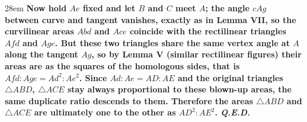 \documentclass[border=4pt]{standalone}
\begin{document}
\begin{varwidth}{28em}
\large\bfseries
Now hold $Ae$ fixed and let $B$ and $C$ meet $A$; the angle $cAg$ between curve      and tangent vanishes, exactly as in Lemma VII, so the curvilinear areas $Abd$ and $Ace$      coincide with the rectilinear triangles $Afd$ and $Age$. But these two triangles      share the same vertex angle at $A$ along the tangent $Ag$, so by Lemma V (similar      rectilinear figures) their areas are as the squares of the homologous sides, that is      $Afd : Age = Ad^2 : Ae^2$. Since $Ad : Ae = AD : AE$ and the original triangles $\triangle      ABD$, $\triangle ACE$ stay always proportional to these blown-up areas, the same duplicate      ratio descends to them. Therefore the areas $\triangle ABD$ and $\triangle ACE$ are      ultimately one to the other as $AD^2 : AE^2$. \textit{Q.E.D.}
\end{varwidth}
\end{document}
